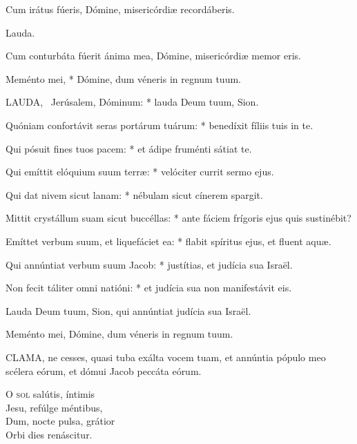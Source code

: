  Cum irátus fúeris, Dómine, misericórdiæ recordáberis.

 Lauda. \textdagger


 Cum conturbáta fúerit ánima mea, Dómine, misericórdiæ memor eris.

 Meménto mei, * Dómine, dum véneris in regnum tuum.


\lettrine[lines=2]{L}{AUDA}, \textdagger\ Jerúsalem, Dóminum: * lauda Deum tuum, Sion.

Quóniam confortávit seras portárum tuárum: * benedíxit fíliis tuis in te.

Qui pósuit fines tuos pacem: * et ádipe fruménti sátiat te.

Qui emíttit elóquium suum terræ: * velóciter currit sermo ejus.

Qui dat nivem sicut lanam: * nébulam sicut cínerem spargit.

Mittit crystállum suam sicut buccéllas: * ante fáciem frígoris ejus quis sustinébit?

Emíttet verbum suum, et liquefáciet ea: * flabit spíritus ejus, et fluent aquæ.

Qui annúntiat verbum suum Jacob: * justítias, et judícia sua Israël.

Non fecit táliter omni natióni: * et judícia sua non manifestávit eis.

 Lauda Deum tuum, Sion, qui annúntiat judícia sua Israël.


 Meménto mei, Dómine, dum véneris in regnum tuum.




\lettrine[lines=2]{C}{LAMA}, ne cesses, quasi tuba exálta vocem tuam, et annúntia pópulo meo scélera eórum, et dómui Jacob peccáta eórum.


\lettrine[lines=2]{O}{} \textsc{sol} salútis, íntimis\\
Jesu, refúlge méntibus,\\
Dum, nocte pulsa, grátior\\
Orbi dies renáscitur.

